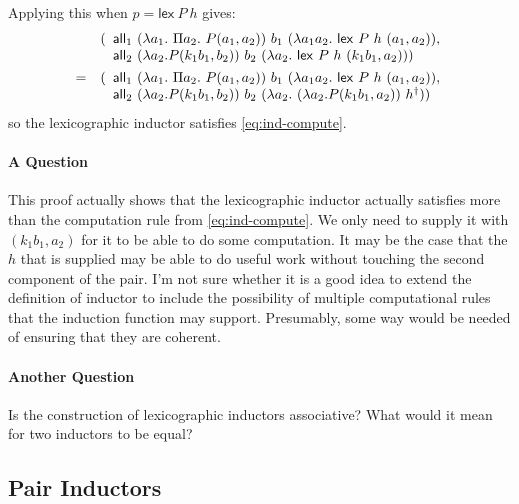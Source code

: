 \documentclass{article}
\begin{document}
Applying this when $p = \mathsf{lex}\ P\ h$ gives:
\begin{eqnarray*}
  & & (
  \begin{array}[t]{l}
    \all_1\ (\lambda a_1.\ \Pi a_2.\ P(a_1,a_2))\ b_1\ (\lambda a_1 a_2.\ \mathsf{lex}\ P\ h\ (a_1,a_2)), \\
    \all_2\ (\lambda a_2. P (k_1 b_1,b_2))\ b_2\ (\lambda a_2.\ \mathsf{lex}\ P\ h\ (k_1b_1,a_2)))
  \end{array}
  \\
  &=& (
  \begin{array}[t]{l}
    \all_1\ (\lambda a_1.\ \Pi a_2.\ P(a_1,a_2))\ b_1\ (\lambda a_1 a_2.\ \mathsf{lex}\ P\ h\ (a_1,a_2)), \\
    \all_2\ (\lambda a_2. P (k_1 b_1,b_2))\ b_2\ (\lambda a_2.\ (\lambda a_2. P(k_1 b_1, a_2))\ h^\dagger))
  \end{array}
\end{eqnarray*}
so the lexicographic inductor satisfies \autoref{eq:ind-compute}.

\paragraph{A Question} 
This proof actually shows that the lexicographic inductor actually
satisfies more than the computation rule from
\autoref{eq:ind-compute}. We only need to supply it with
$(k_1b_1,a_2)$ for it to be able to do some computation. It may be the
case that the $h$ that is supplied may be able to do useful work
without touching the second component of the pair. I'm not sure
whether it is a good idea to extend the definition of inductor to
include the possibility of multiple computational rules that the
induction function may support. Presumably, some way would be needed
of ensuring that they are coherent.

\paragraph{Another Question} Is the construction of lexicographic
inductors associative? What would it mean for two inductors to be
equal?

\subsection{Pair Inductors}
\end{document}
